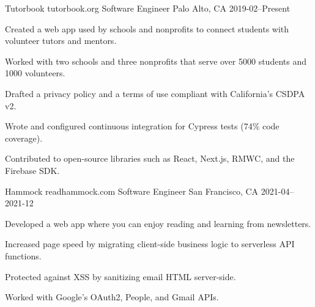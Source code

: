 

\begin{cventries}

  \cventry
    {Tutorbook} %
    {tutorbook.org} %
    {Software Engineer} %
    {Palo Alto, CA} %
    {2019-02–Present} %
    {
      \begin{cvitems} %
        \item {Created a web app used by schools and nonprofits to connect students with volunteer tutors and mentors.}
        \item {Worked with two schools and three nonprofits that serve over 5000 students and 1000 volunteers.}
        \item {Drafted a privacy policy and a terms of use compliant with California's CSDPA v2.}
        \item {Wrote and configured continuous integration for Cypress tests (74\% code coverage).}
        \item {Contributed to open-source libraries such as React, Next.js, RMWC, and the Firebase SDK.}
      \end{cvitems}
    }

  \cventry
    {Hammock} %
    {readhammock.com} %
    {Software Engineer} %
    {San Francisco, CA} %
    {2021-04–2021-12} %
    {
      \begin{cvitems} %
        \item {Developed a web app where you can enjoy reading and learning from newsletters.}
        \item {Increased page speed by migrating client-side business logic to serverless API functions.}
        \item {Protected against XSS by sanitizing email HTML server-side.}
        \item {Worked with Google's OAuth2, People, and Gmail APIs.}
      \end{cvitems}
    }


\end{cventries}
